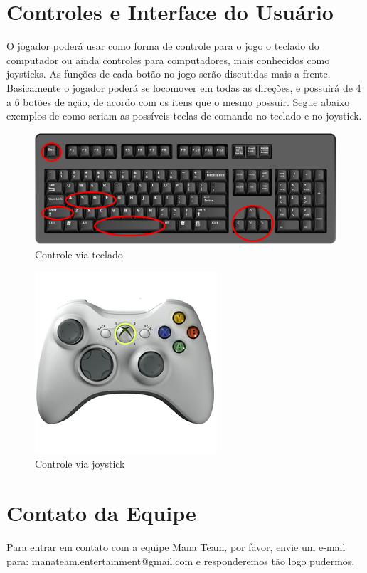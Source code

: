 \documentclass{article}
\begin{document}
\section{Controles e Interface do Usuário}
O jogador poderá usar como forma de controle para o jogo o teclado do computador ou ainda controles para computadores, mais conhecidos como joysticks. As funções de cada botão no jogo serão discutidas mais a frente. Basicamente o jogador poderá se locomover em todas as direções, e possuirá de 4 a 6 botões de ação, de acordo com os itens que o mesmo possuir. Segue abaixo exemplos de como seriam as possíveis teclas de comando no teclado e no joystick.

\begin{figure}[ht]
    \centering
    \caption{Controle via teclado}
    \includegraphics[keepaspectratio=true,scale=0.4]{controles.png}
\end{figure}

\begin{figure}[ht]
    \centering
    \caption{Controle via joystick}
    \includegraphics[keepaspectratio=true,scale=0.7]{joy360.png}
\end{figure}

\section{Contato da Equipe}
Para entrar em contato com a equipe Mana Team, por favor, envie um e-mail para: manateam.entertainment@gmail.com e responderemos tão logo pudermos.
\end{document}
